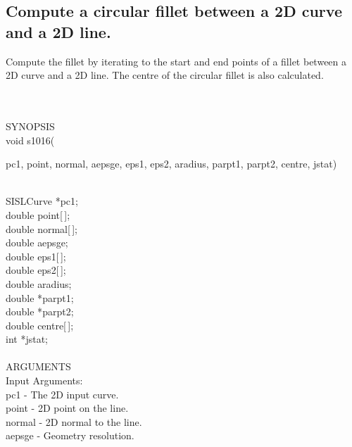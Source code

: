 \subsection{Compute a circular fillet between a 2D curve and a 2D line.}
\begin{minipg1}
  Compute the fillet by iterating to the start and end points of a
  fillet between a 2D curve and a 2D line. The centre of the circular
  fillet is also calculated.
\end{minipg1}\\ \\
SYNOPSIS\\
        \>void s1016(\begin{minipg3}
          {\fov pc1}, {\fov point}, {\fov normal}, {\fov aepsge}, {\fov eps1}, {\fov eps2}, {\fov aradius},
          {\fov parpt1}, {\fov parpt2}, {\fov centre}, {\fov jstat})
        \end{minipg3}\\[0.3ex]
                \>\>    SISLCurve \> *{\fov pc1};\\
                \>\>    double    \> {\fov point}[\,];\\
                \>\>    double    \> {\fov normal}[\,];\\
                \>\>    double    \> {\fov aepsge};\\
                \>\>    double    \> {\fov eps1}[\,];\\
                \>\>    double    \> {\fov eps2}[\,];\\
                \>\>    double    \> {\fov aradius};\\
                \>\>    double    \> *{\fov parpt1};\\
                \>\>    double    \> *{\fov parpt2};\\
                \>\>    double    \> {\fov centre}[\,];\\
                \>\>    int       \> *{\fov jstat};\\
\\
ARGUMENTS\\
        \>Input Arguments:\\
        \>\>    {\fov pc1}     \> - \> The 2D input curve.\\
        \>\>    {\fov point}   \> - \> 2D point on the line.\\
        \>\>    {\fov normal}  \> - \> 2D normal to the line.\\
        \>\>    {\fov aepsge}  \> - \> Geometry resolution.\\
